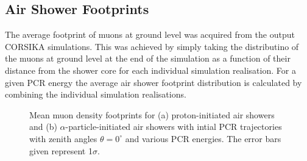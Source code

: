 \subsection{Air Shower Footprints}\label{sec:CORSIKA_footprint}

The average footprint of muons at ground level was acquired from the output CORSIKA simulations. This was achieved by simply taking the distributino of the muons at ground level at the end of the simulation as a function of their distance from the shower core for each individual simulation realisation. For a given PCR energy the average air shower footprint distribution is calculated by combining the individual simulation realisations.


\begin{figure}
	\centering
	\qquad
	\caption{Mean muon density footprints for (a) proton-initiated air showers and (b) $\alpha$-particle-initiated air showers with intial PCR trajectories with zenith angles $\theta=0^{\circ}$ and various PCR energies. The error bars given represent 1$\sigma$.} \label{fig:shower_footprints}
\end{figure}

